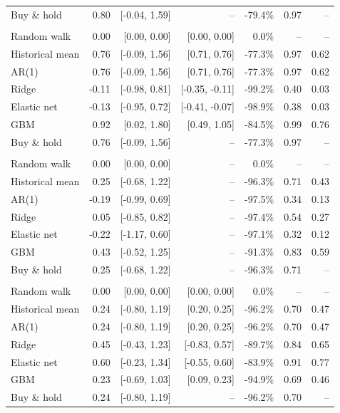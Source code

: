 \begin{tabular}{lrrrrrr}
\quad Buy \& hold & 0.80 & [-0.04, 1.59] & -- & -79.4\% & 0.97 & -- \\
\addlinespace
\multicolumn{7}{l}{\emph{ETH, $h=7$}} \\
\quad Random walk & 0.00 & [0.00, 0.00] & [0.00, 0.00] & 0.0\% & -- & -- \\
\quad Historical mean & 0.76 & [-0.09, 1.56] & [0.71, 0.76] & -77.3\% & 0.97 & 0.62 \\
\quad AR(1) & 0.76 & [-0.09, 1.56] & [0.71, 0.76] & -77.3\% & 0.97 & 0.62 \\
\quad Ridge & -0.11 & [-0.98, 0.81] & [-0.35, -0.11] & -99.2\% & 0.40 & 0.03 \\
\quad Elastic net & -0.13 & [-0.95, 0.72] & [-0.41, -0.07] & -98.9\% & 0.38 & 0.03 \\
\quad GBM & 0.92 & [0.02, 1.80] & [0.49, 1.05] & -84.5\% & 0.99 & 0.76 \\
\quad Buy \& hold & 0.76 & [-0.09, 1.56] & -- & -77.3\% & 0.97 & -- \\
\addlinespace
\multicolumn{7}{l}{\emph{SOL, $h=1$}} \\
\quad Random walk & 0.00 & [0.00, 0.00] & -- & 0.0\% & -- & -- \\
\quad Historical mean & 0.25 & [-0.68, 1.22] & -- & -96.3\% & 0.71 & 0.43 \\
\quad AR(1) & -0.19 & [-0.99, 0.69] & -- & -97.5\% & 0.34 & 0.13 \\
\quad Ridge & 0.05 & [-0.85, 0.82] & -- & -97.4\% & 0.54 & 0.27 \\
\quad Elastic net & -0.22 & [-1.17, 0.60] & -- & -97.1\% & 0.32 & 0.12 \\
\quad GBM & 0.43 & [-0.52, 1.25] & -- & -91.3\% & 0.83 & 0.59 \\
\quad Buy \& hold & 0.25 & [-0.68, 1.22] & -- & -96.3\% & 0.71 & -- \\
\addlinespace
\multicolumn{7}{l}{\emph{SOL, $h=7$}} \\
\quad Random walk & 0.00 & [0.00, 0.00] & [0.00, 0.00] & 0.0\% & -- & -- \\
\quad Historical mean & 0.24 & [-0.80, 1.19] & [0.20, 0.25] & -96.2\% & 0.70 & 0.47 \\
\quad AR(1) & 0.24 & [-0.80, 1.19] & [0.20, 0.25] & -96.2\% & 0.70 & 0.47 \\
\quad Ridge & 0.45 & [-0.43, 1.23] & [-0.83, 0.57] & -89.7\% & 0.84 & 0.65 \\
\quad Elastic net & 0.60 & [-0.23, 1.34] & [-0.55, 0.60] & -83.9\% & 0.91 & 0.77 \\
\quad GBM & 0.23 & [-0.69, 1.03] & [0.09, 0.23] & -94.9\% & 0.69 & 0.46 \\
\quad Buy \& hold & 0.24 & [-0.80, 1.19] & -- & -96.2\% & 0.70 & -- \\
\bottomrule
\end{tabular}
